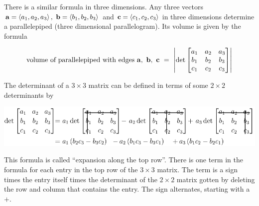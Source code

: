 There is a similar formula in three dimensions. Any three vectors 
$\mathbf{a}=\left< a_1,a_2,a_3\right> ,\ \mathbf{b}=\left< b_1,b_2,b_3\right> $ and 
$\mathbf{c}=\left< c_1,c_2,c_3\right> $ in three dimensions
%
determine a parallelepiped 
(three dimensional parallelogram). Its volume is given by the formula
\begin{impeqn}\label{eq piped volume}
\begin{align*}
\text{volume of parallelepiped with edges $\va,\ \vb,\ \vc\ 
=\ \left|
\det\left[\begin{matrix}a_1&a_2&a_3\\ b_1&b_2&b_3\\ c_1&c_2&c_3\end{matrix}\right]
\right|$}
\end{align*}
\end{impeqn}
The determinant of a $3\times 3$ matrix can be defined in terms
of some $2\times 2$ determinants by
      \begin{center}
      \includegraphics{det2}%
      \end{center}
This formula is called ``expansion along the top row''. There
is one term in the formula for each entry in the top row of the $3\times 3$
matrix. The term is
a sign times the entry itself times the determinant of the $2\times 2$ matrix
gotten by deleting the row and column that contains the entry. The sign
alternates, starting with a $+$. 

